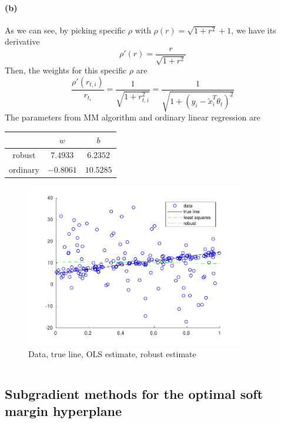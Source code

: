 \documentclass[12pt]{article}
\begin{document}
\paragraph{(b)}
As we can see, by picking specific \(\rho\) with \(\rho(r)=\sqrt{1+r^2}+1\), we have its derivative
\[ \rho'(r)=\frac{r}{\sqrt{1+r^2}} \]
Then, the weights for this specific \(\rho\) are
\[ \frac{\rho'(r_{t,i})}{r_{t_i}}=\frac{1}{\sqrt{1+r_{t,i}^2}}=\frac{1}{\sqrt{1+\left(y_i-\tilde{x}_i^T\theta_t\right)^2}} \]
The parameters from MM algorithm and ordinary linear regression are
\begin{center}
\begin{tabular}{c|cc}
    & \(w\) & \(b\) \\ \hline
    robust & \(7.4933\) & \(6.2352\) \\ \hline
    ordinary & \(-0.8061\) & \(10.5285\)
\end{tabular}
\end{center}
\begin{figure}[htbp]
    \centering
    \includegraphics[width=0.85\textwidth]{./hw3/problem2/hw3p2.pdf}
    \caption{Data, true line, OLS estimate, robust estimate}
\end{figure}
\inputminted[frame=single,framesep=10pt,linenos,xleftmargin=\parindent]{octave}{./hw3/problem2/Robust_regression.m}
\setcounter{subsection}{3}
\subsection{Subgradient methods for the optimal soft margin hyperplane}
\end{document}
